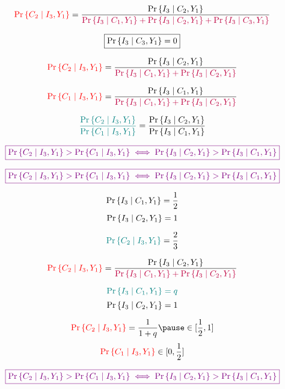 \begin{frame}{}
  \[
    \textcolor{red}{\Pr\left\{C_2 \mid I_3, Y_1\right\}} = \frac{\Pr{\left\{I_3 \mid C_2, Y_1\right\}}}
      {\textcolor{purple}{\Pr\left\{I_3 \mid C_1, Y_1\right\} + \Pr\left\{I_3 \mid C_2, Y_1\right\} + \Pr\left\{I_3 \mid C_3, Y_1\right\}}}
  \]

  \pause
  \[
    \boxed{\Pr\left\{I_3 \mid C_3, Y_1\right\} = 0}
  \]

  \pause
  \[
    \textcolor{red}{\Pr\left\{C_2 \mid I_3, Y_1\right\}} = \frac{\Pr{\left\{I_3 \mid C_2, Y_1\right\}}}
      {\textcolor{purple}{\Pr\left\{I_3 \mid C_1, Y_1\right\} + \Pr\left\{I_3 \mid C_2, Y_1\right\}}}
  \]

  \pause
  \[
    \textcolor{red}{\Pr\left\{C_1 \mid I_3, Y_1\right\}} = \frac{\Pr{\left\{I_3 \mid C_1, Y_1\right\}}}
      {\textcolor{purple}{\Pr\left\{I_3 \mid C_1, Y_1\right\} + \Pr\left\{I_3 \mid C_2, Y_1\right\}}}
  \]

  \pause
  \[
    \textcolor{teal}{\frac{\Pr\left\{C_2 \mid I_3, Y_1\right\}}{\Pr\left\{C_1 \mid I_3, Y_1\right\}}} = \frac{\Pr{\left\{I_3 \mid C_2, Y_1\right\}}}
    {\Pr\left\{I_3 \mid C_1, Y_1\right\}}
  \]

  \pause
  \[
    \textcolor{violet}{\boxed{\Pr\left\{C_2 \mid I_3, Y_1\right\} > \Pr\left\{C_1 \mid I_3, Y_1\right\} \iff \Pr{\left\{I_3 \mid C_2, Y_1\right\}} > \Pr{\left\{I_3 \mid C_1, Y_1\right\}}}}
  \]
\end{frame}

\begin{frame}{}
  \[
    \textcolor{violet}{\boxed{\Pr\left\{C_2 \mid I_3, Y_1\right\} > \Pr\left\{C_1 \mid I_3, Y_1\right\} \iff \Pr{\left\{I_3 \mid C_2, Y_1\right\}} > \Pr{\left\{I_3 \mid C_1, Y_1\right\}}}}
  \]

  \pause
  \vspace{0.30cm}
  \[
    \Pr\left\{I_3 \mid C_1, Y_1\right\} = \frac{1}{2}
  \]
  \[
    \Pr\left\{I_3 \mid C_2, Y_1\right\} = 1
  \]

  \[
    \textcolor{teal}{\Pr\left\{C_2 \mid I_3, Y_1\right\}} = \frac{2}{3}
  \]

  \pause
  \vspace{0.30cm}
  \begin{center}
  \end{center}
\end{frame}

\begin{frame}{}
  \[
    \textcolor{red}{\Pr\left\{C_2 \mid I_3, Y_1\right\}} = \frac{\Pr{\left\{I_3 \mid C_2, Y_1\right\}}}
      {\textcolor{purple}{\Pr\left\{I_3 \mid C_1, Y_1\right\} + \Pr\left\{I_3 \mid C_2, Y_1\right\}}}
  \]

  \pause
  \[
    \textcolor{teal}{\Pr\left\{I_3 \mid C_1, Y_1\right\} = q}
  \]
  \[
    \Pr\left\{I_3 \mid C_2, Y_1\right\} = 1
  \]

  \pause
  \[
    \red{\Pr\set{C_2 \mid I_3, Y_1}} = \frac{1}{1 + q} \pause \in [\frac{1}{2}, 1]
  \]
  \pause
  \[
    \textcolor{red}{\Pr\left\{C_1 \mid I_3, Y_1\right\}} \in [0, \frac{1}{2}]
  \]

  \pause
  \vspace{0.30cm}
  \centerline{}

  \pause
  \vspace{-0.20cm}
  \[
    \textcolor{violet}{\boxed{\Pr\left\{C_2 \mid I_3, Y_1\right\} > \Pr\left\{C_1 \mid I_3, Y_1\right\} \iff \Pr{\left\{I_3 \mid C_2, Y_1\right\}} > \Pr{\left\{I_3 \mid C_1, Y_1\right\}}}}
  \]
\end{frame}

